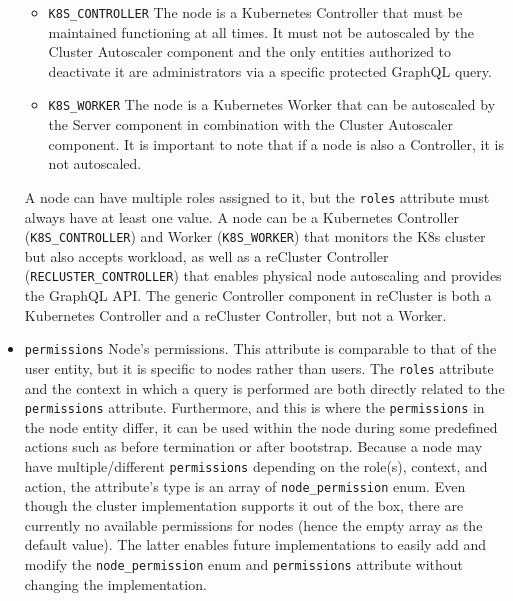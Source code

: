 \begin{itemize}
\begin{itemize}
      \item \texttt{K8S\_CONTROLLER}
        \newline
        The node is a Kubernetes Controller that must be maintained functioning
        at all times.
        \newline
        It must not be autoscaled by the Cluster Autoscaler component and the only
        entities authorized to deactivate it are administrators via a specific protected
        GraphQL query.

      \item \texttt{K8S\_WORKER}
        \newline
        The node is a Kubernetes Worker that can be autoscaled by the Server
        component in combination with the Cluster Autoscaler component.
        \newline
        It is important to note that if a node is also a Controller, it is not
        autoscaled.
    \end{itemize}
    A node can have multiple roles assigned to it, but the \texttt{roles}
    attribute must always have at least one value. A node can be a Kubernetes Controller
    (\texttt{K8S\_CONTROLLER}) and Worker (\texttt{K8S\_WORKER}) that monitors the
    K8s cluster but also accepts workload, as well as a reCluster Controller (\texttt{RECLUSTER\_CONTROLLER})
    that enables physical node autoscaling and provides the GraphQL API.
    \newline
    The generic Controller component in reCluster is both a Kubernetes
    Controller and a reCluster Controller, but not a Worker.

  \item \texttt{permissions}
    \newline
    Node's permissions.
    \newline
    This attribute is comparable to that of the user entity, but it is specific
    to nodes rather than users. The \texttt{roles} attribute and the context in
    which a query is performed are both directly related to the \texttt{permissions}
    attribute. Furthermore, and this is where the \texttt{permissions} in the
    node entity differ, it can be used within the node during some predefined actions
    such as before termination or after bootstrap.
    \newline
    Because a node may have multiple/different \texttt{permissions} depending on
    the role(s), context, and action, the attribute's type is an array of \texttt{node\_permission}
    enum.
    \newline
    Even though the cluster implementation supports it out of the box, there are
    currently no available permissions for nodes (hence the empty array as the default
    value). The latter enables future implementations to easily add and modify the
    \texttt{node\_permission} enum and \texttt{permissions} attribute without changing
    the implementation.


\end{itemize}
